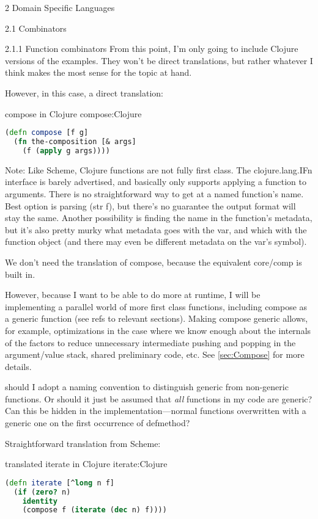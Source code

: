 \documentclass[12pt]{PalisadesLakesBook}
\begin{document}
\begin{plSection}{}
\begin{plSection}{2 Domain Specific Languages}
\begin{plSection}{2.1 Combinators}
\begin{plSection}{2.1.1 Function combinators}
From this point, I'm only going to include Clojure versions
of the examples.
They won't be direct translations, but rather whatever I think
makes the most sense for the topic at hand.

However, in this case, a direct translation:

\begin{plListing}
{{\clojureFont compose} in Clojure}
{compose:Clojure}
\begin{lstlisting}[language=clojure]
(defn compose [f g]
  (fn the-composition [& args]
    (f (apply g args))))
\end{lstlisting}
\end{plListing}

Note: Like Scheme, Clojure functions are not fully first class.
The {\javaFont clojure.lang.IFn} interface is barely advertised,
and basically only supports applying a function to arguments.
There is no straightforward way 
to get at a named function's name.
Best option is parsing {\clojureFont (str f)},
but there's no guarantee the output format will stay the same.
Another possibility is finding the name in the function's 
metadata, but it's also pretty murky
what metadata goes with the {\clojureFont var},
and which with the function object
(and there may even be different metadata on the 
{\clojureFont var}'s symbol).

We don't need the translation of {\schemeFont compose}, 
because the equivalent {\clojureFont core/comp}
is built in.

However, because I want to be able to do more at runtime,
I will be implementing a parallel world of more first class
functions, including {\clojureFont compose}
as a generic function (see \TODO refs to relevant sections).
Making {\clojureFont compose} generic allows,
for example, optimizations in the case where we know enough
about the internals of the factors to reduce unnecessary
intermediate pushing and popping in the argument/value stack,
shared preliminary code, etc.
See \cref{sec:Compose} for more details.

\TODO should I adopt a naming convention to distinguish
generic from non-generic functions. Or should it just be assumed
that \emph{all} functions in my code are generic?
Can this be hidden in the implementation---normal functions
overwritten with a generic one on the first occurrence
of {\clojureFont defmethod}?

Straightforward translation from Scheme:
\begin{plListing}
{translated {\clojureFont iterate} in Clojure}
{iterate:Clojure}
\begin{lstlisting}[language=clojure]
(defn iterate [^long n f]
  (if (zero? n)
    identity
    (compose f (iterate (dec n) f))))
    

\end{lstlisting}
\end{plListing}
\end{plSection}
\end{plSection}
\end{plSection}
\end{plSection}
\end{document}
